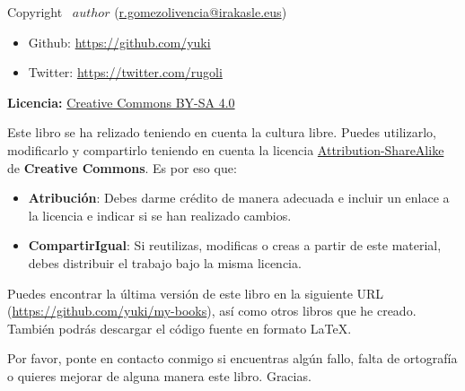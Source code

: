 \documentclass[11pt,titlepage,twoside,openany]{book}
\newenvironment{custombox}[4]{
  \begin{tcolorbox}[
      colframe=#1, colbacktitle=#1,
      colupper=#1, colback=#2,
      enhanced, sidebyside, segmentation hidden,
      lefthand width=1.2cm,
      title=\textbf{#3},]
    \centering
    \color{#1}
    \fontsize{30pt}{-10pt}#4
    \tcblower
    \color{#1}
}{
  \end{tcolorbox}
}
\newenvironment{infobox}{
  \begin{custombox}{cyan!60!black}{cyan!5!white}{Información}{\faInfoCircle}
}{
  \end{custombox}
}
\begin{document}
\null
\vfill
\begin{flushleft}
    

    Copyright \textcopyright \ $author$ \hspace{1pt} (\href{mailto:me@somewhere.com}{r.gomezolivencia@irakasle.eus})
    \begin{itemize}
        \item Github: \href{https://github.com/yuki}{https://github.com/yuki}
        \item Twitter: \href{https://twitter.com/rugoli}{https://twitter.com/rugoli}
    \end{itemize}


    \vspace{5mm}
    \textbf{Licencia: } \href{https://creativecommons.org/licenses/by-sa/4.0/deed.es}{Creative Commons BY-SA 4.0}


    Este libro se ha relizado teniendo en cuenta la cultura libre. Puedes utilizarlo, modificarlo y compartirlo teniendo en cuenta la licencia \href{https://creativecommons.org/licenses/by-sa/4.0/}{Attribution-ShareAlike} de \textbf{Creative Commons}. Es por eso que:

    \begin{itemize}
        \item \textbf{Atribución}: Debes darme crédito de manera adecuada e incluir un enlace a la licencia e indicar si se han realizado cambios.
        \item \textbf{CompartirIgual}: Si reutilizas, modificas o creas a partir de este material, debes distribuir el trabajo bajo la misma licencia.
    \end{itemize}


    Puedes encontrar la última versión de este libro en la siguiente URL (\href{https://github.com/yuki/my-books}{https://github.com/yuki/my-books}), así como otros libros que he creado. También podrás descargar el código fuente en formato \LaTeX{}.

    \begin{infobox}
        Por favor, ponte en contacto conmigo si encuentras algún fallo, falta de ortografía o quieres mejorar de alguna manera este libro. Gracias.
    \end{infobox}
    \vspace{5mm}
\end{flushleft}

\clearpage


\end{document}
